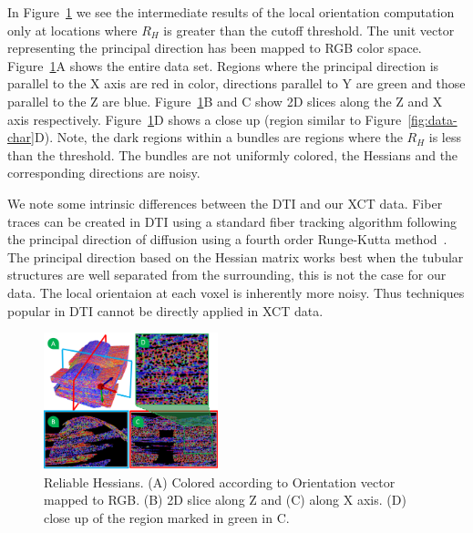 In Figure~\ref{fig:reliable_hessian} we see the intermediate results of the local orientation computation only at locations where $R_{H}$ is greater than the cutoff threshold. The unit vector representing the principal direction has been mapped to RGB color space. Figure~\ref{fig:reliable_hessian}A shows the entire data set. Regions where the principal direction is parallel to the X axis are red in color, directions parallel to Y are green and those parallel to the Z are blue. Figure~\ref{fig:reliable_hessian}B and C show 2D slices along the Z and X axis respectively. Figure~\ref{fig:reliable_hessian}D shows a close up (region similar to Figure~\ref{fig:data-char}D). Note, the dark regions within a bundles are regions where the $R_H$ is less than the threshold. The bundles are not uniformly colored, the Hessians and the corresponding directions are noisy.

 
We note some intrinsic differences between the DTI and our XCT data. Fiber traces can be created in DTI using a standard fiber tracking algorithm following the principal direction of diffusion using a fourth order Runge-Kutta method~\cite{Brun2003}. The principal direction based on the Hessian matrix works best when the tubular structures are well separated from the surrounding, this is not the case for our data. The local orientaion at each voxel is inherently more noisy. Thus techniques popular in DTI cannot be directly applied in XCT data.

%
\begin{figure}[tb]
\centering
\includegraphics[width=0.45\textwidth]{imagesMT2014/MT_data_rh.png}
\caption{Reliable Hessians. (A) Colored according to Orientation vector mapped to RGB. (B) 2D slice along Z and (C) along X axis. (D) close up of the region marked in green in C.}
\label{fig:reliable_hessian}
\end{figure}


